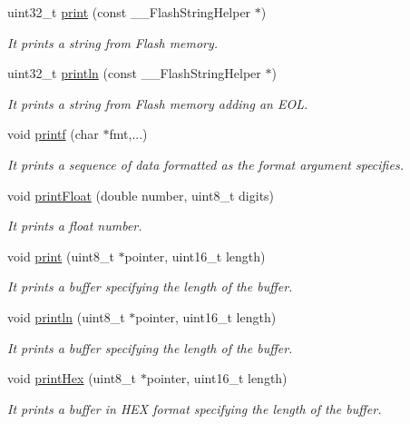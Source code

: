\begin{DoxyCompactItemize}
uint32\+\_\+t \hyperlink{class_wasp_u_s_b_a0f1b0ade8268eb66c67d43c8e6dd0d70}{print} (const \+\_\+\+\_\+\+Flash\+String\+Helper $\ast$)
\begin{DoxyCompactList}\small\item\em It prints a string from Flash memory. \end{DoxyCompactList}\item 
uint32\+\_\+t \hyperlink{class_wasp_u_s_b_a65bc1500730ffefca6ed6d78bf35e5d4}{println} (const \+\_\+\+\_\+\+Flash\+String\+Helper $\ast$)
\begin{DoxyCompactList}\small\item\em It prints a string from Flash memory adding an E\+OL. \end{DoxyCompactList}\item 
void \hyperlink{class_wasp_u_s_b_ace305f71dd8a0a28c3d01e7c20a18cdb}{printf} (char $\ast$fmt,...)
\begin{DoxyCompactList}\small\item\em It prints a sequence of data formatted as the format argument specifies. \end{DoxyCompactList}\item 
void \hyperlink{class_wasp_u_s_b_a56f23ade3e4777186b924792e047073b}{print\+Float} (double number, uint8\+\_\+t digits)
\begin{DoxyCompactList}\small\item\em It prints a \textquotesingle{}float\textquotesingle{} number. \end{DoxyCompactList}\item 
void \hyperlink{class_wasp_u_s_b_abae6626a79de5133ee4cf3d748ab687f}{print} (uint8\+\_\+t $\ast$pointer, uint16\+\_\+t length)
\begin{DoxyCompactList}\small\item\em It prints a buffer specifying the length of the buffer. \end{DoxyCompactList}\item 
void \hyperlink{class_wasp_u_s_b_a525ed14d2e553bdf940a22d856d97952}{println} (uint8\+\_\+t $\ast$pointer, uint16\+\_\+t length)
\begin{DoxyCompactList}\small\item\em It prints a buffer specifying the length of the buffer. \end{DoxyCompactList}\item 
void \hyperlink{class_wasp_u_s_b_a182f4452a07af8b3ea8cf0bb03a8f038}{print\+Hex} (uint8\+\_\+t $\ast$pointer, uint16\+\_\+t length)
\begin{DoxyCompactList}\small\item\em It prints a buffer in H\+EX format specifying the length of the buffer. \end{DoxyCompactList}\item 

\end{DoxyCompactItemize}
